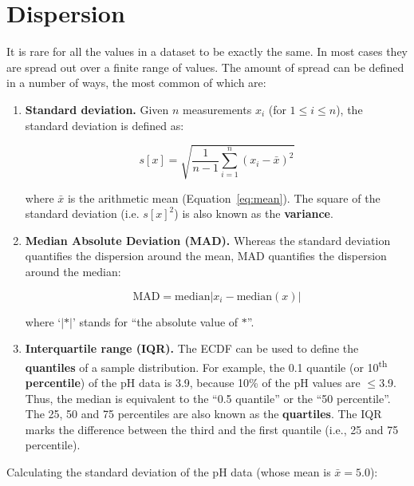 \section{Dispersion}
\label{sec:dispersion}

It is rare for all the values in a dataset to be exactly the same. In
most cases they are spread out over a finite range of values. The
amount of spread can be defined in a number of ways, the most common
of which are:

\begin{enumerate}

\item{\bf Standard deviation.} Given $n$ measurements $x_i$ (for $1
  \leq i \leq n$), the standard deviation is defined as:

\begin{equation}
  s[x] = \sqrt{\frac{1}{n-1}\sum\limits_{i=1}^{n}(x_i-\bar{x})^2}
  \label{eq:stdev}
\end{equation}

\noindent where $\bar{x}$ is the arithmetic mean
(Equation~\ref{eq:mean}). The square of the standard deviation
(i.e. $s[x]^2$) is also known as the \textbf{variance}.

\item{\bf Median Absolute Deviation (MAD).} Whereas the standard
  deviation quantifies the dispersion around the mean, MAD quantifies
  the dispersion around the median:

  \begin{equation}
    \mbox{MAD} = \mbox{median}|x_i - \mbox{median}(x)|
    \label{eq:MAD}
  \end{equation}

  \noindent where `$|\ast|$' stands for ``the absolute value of
  $\ast$''.
  
\item{\bf Interquartile range (IQR).} The ECDF can be used to define
  the \textbf{quantiles} of a sample distribution. For example, the
  0.1 quantile (or 10\textsuperscript{th} \textbf{percentile}) of the
  pH data is 3.9, because 10\% of the pH values are $\leq$3.9. Thus,
  the median is equivalent to the ``0.5 quantile'' or the ``50
  percentile''. The 25, 50 and 75 percentiles are also known as the
  \textbf{quartiles}. The IQR marks the difference between the third
  and the first quantile (i.e., 25 and 75 percentile).
  
\end{enumerate}

Calculating the standard deviation of the pH data (whose mean is
$\bar{x} = 5.0$):

